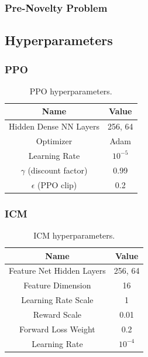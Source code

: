 \subsubsection{Pre-Novelty Problem}




\subsection{Hyperparameters}
\label{sec:ng_hyperparameters}

\subsubsection{PPO}

\begin{table}[htbp]
    \centering
    \begin{tabular}{cc}
    \toprule
        Name &  Value  \\
    \midrule
        Hidden Dense NN Layers  & 256, 64\\
        Optimizer & Adam \\
        Learning Rate & $10^{-5}$ \\
        $\gamma$ (discount factor) & 0.99 \\
        $\epsilon$ (PPO clip) & 0.2 \\
    \bottomrule
    \end{tabular}
    \caption{PPO hyperparameters.}
    \label{tab:ppo-param}
\end{table}

\subsubsection{ICM}

\begin{table}[htbp]
    \centering
    \begin{tabular}{cc}
    \toprule
        Name &  Value  \\
    \midrule
        Feature Net Hidden Layers & 256, 64 \\
        Feature Dimension & 16 \\
        Learning Rate Scale & 1 \\
        Reward Scale & 0.01 \\
        Forward Loss Weight & 0.2 \\
        Learning Rate & $10^{-4}$ \\
    \bottomrule
    \end{tabular}
    \caption{ICM hyperparameters.}
    \label{tab:icm-param}
\end{table}

